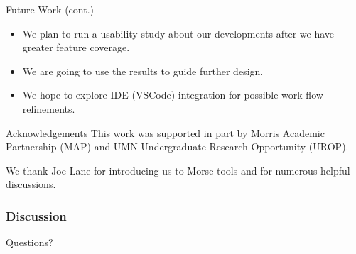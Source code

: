 \documentclass{beamer}
\begin{document}
\begin{frame}{Future Work (cont.)}
  \begin{itemize}
    \item<1-> We plan to run a usability study about our developments after we have greater feature coverage.
    \item<2-> We are going to use the results to guide further design.
    \item<3-> We hope to explore IDE (VSCode) integration for possible work-flow refinements.
  \end{itemize}
\end{frame}

\begin{frame}{Acknowledgements}
This work was supported in part by Morris Academic Partnership (MAP) and UMN Undergraduate Research Opportunity (UROP).  \\ 

\vspace*{0.2in}

We thank Joe Lane for introducing us to Morse tools and for numerous helpful discussions.
\end{frame}

\begin{frame}
  \frametitle{Discussion}
Questions?
\end{frame}
\end{document}
